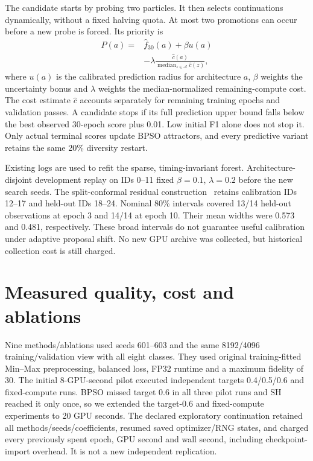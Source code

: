 The candidate starts by probing two particles. It then selects continuations dynamically, without a fixed halving quota. At most two promotions can occur before a new probe is forced. Its priority is
\begin{equation}
\begin{split}
P(a)={}&\widehat f_{30}(a)+\beta u(a)\\
&-\lambda\frac{\widehat c(a)}{\operatorname{median}_{z\in\mathcal A}\widehat c(z)},
\end{split}
\end{equation}
where $u(a)$ is the calibrated prediction radius for architecture $a$, $\beta$ weights the uncertainty bonus and $\lambda$ weights the median-normalized remaining-compute cost. The cost estimate $\widehat c$ accounts separately for remaining training epochs and validation passes. A candidate stops if its full prediction upper bound falls below the best observed 30-epoch score plus 0.01. Low initial F1 alone does not stop it. Only actual terminal scores update BPSO attractors, and every predictive variant retains the same 20\% diversity restart.

Existing logs are used to refit the sparse, timing-invariant forest. Architecture-disjoint development replay on IDs 0--11 fixed $\beta=0.1$, $\lambda=0.2$ before the new search seeds. The split-conformal residual construction~\cite{angelopoulos2021} retains calibration IDs 12--17 and held-out IDs 18--24. Nominal 80\% intervals covered 13/14 held-out observations at epoch 3 and 14/14 at epoch 10. Their mean widths were 0.573 and 0.481, respectively. These broad intervals do not guarantee useful calibration under adaptive proposal shift. No new GPU archive was collected, but historical collection cost is still charged.

\section{Measured quality, cost and ablations}
\label{sec:amf-measured}
Nine methods/ablations used seeds 601--603 and the same 8192/4096 training/validation view with all eight classes. They used original training-fitted Min--Max preprocessing, balanced loss, FP32 runtime and a maximum fidelity of 30. The initial 8-GPU-second pilot executed independent targets 0.4/0.5/0.6 and fixed-compute runs. BPSO missed target 0.6 in all three pilot runs and SH reached it only once, so we extended the target-0.6 and fixed-compute experiments to 20 GPU seconds. The declared exploratory continuation retained all methods/seeds/coefficients, resumed saved optimizer/RNG states, and charged every previously spent epoch, GPU second and wall second, including checkpoint-import overhead. It is not a new independent replication.

